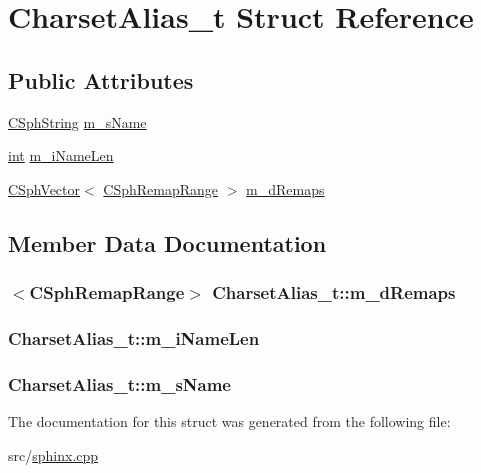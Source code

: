 \hypertarget{structCharsetAlias__t}{\section{Charset\-Alias\-\_\-t Struct Reference}
\label{structCharsetAlias__t}
}
\subsection*{Public Attributes}
\begin{DoxyCompactItemize}
\item 
\hyperlink{structCSphString}{C\-Sph\-String} \hyperlink{structCharsetAlias__t_a6bbf8839f56aa8b062866d9033f1a83f}{m\-\_\-s\-Name}
\item 
\hyperlink{sphinxexpr_8cpp_a4a26e8f9cb8b736e0c4cbf4d16de985e}{int} \hyperlink{structCharsetAlias__t_a804fa89e2d1783f398671967165dc2ee}{m\-\_\-i\-Name\-Len}
\item 
\hyperlink{classCSphVector}{C\-Sph\-Vector}$<$ \hyperlink{structCSphRemapRange}{C\-Sph\-Remap\-Range} $>$ \hyperlink{structCharsetAlias__t_a861aa3e71ad8a8ecb2dd4f29ffa57273}{m\-\_\-d\-Remaps}
\end{DoxyCompactItemize}


\subsection{Member Data Documentation}
\hypertarget{structCharsetAlias__t_a861aa3e71ad8a8ecb2dd4f29ffa57273}{
\subsubsection[{m\-\_\-d\-Remaps}]{$<${\bf C\-Sph\-Remap\-Range}$>$ Charset\-Alias\-\_\-t\-::m\-\_\-d\-Remaps}}\label{structCharsetAlias__t_a861aa3e71ad8a8ecb2dd4f29ffa57273}
\hypertarget{structCharsetAlias__t_a804fa89e2d1783f398671967165dc2ee}{
\subsubsection[{m\-\_\-i\-Name\-Len}]{ Charset\-Alias\-\_\-t\-::m\-\_\-i\-Name\-Len}}\label{structCharsetAlias__t_a804fa89e2d1783f398671967165dc2ee}
\hypertarget{structCharsetAlias__t_a6bbf8839f56aa8b062866d9033f1a83f}{
\subsubsection[{m\-\_\-s\-Name}]{ Charset\-Alias\-\_\-t\-::m\-\_\-s\-Name}}\label{structCharsetAlias__t_a6bbf8839f56aa8b062866d9033f1a83f}


The documentation for this struct was generated from the following file\-:\begin{DoxyCompactItemize}
\item 
src/\hyperlink{sphinx_8cpp}{sphinx.\-cpp}\end{DoxyCompactItemize}
